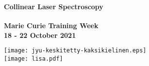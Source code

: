\begin{titlepage}
	
    \begin{center}
        
        \LARGE{\textbf{Collinear Laser Spectroscopy}}\\
        \vspace{0.15\textheight}
        \LARGE{\textbf{}}\\
        \vspace{0.05\textheight}
        \large{\textbf{Marie Curie Training Week}}\\
        \large{\textbf{18 - 22 October 2021}}\\
    \end{center}
    \vspace{0.08\textheight}
       
         
    \vspace{0.05\textheight}
    \centering

    \centering
    \vfill
    \texttt{[image: jyu-keskitetty-kaksikielinen.eps]}\\
    \vspace{0.1\textheight}
    \texttt{[image: lisa.pdf]}

\end{titlepage}